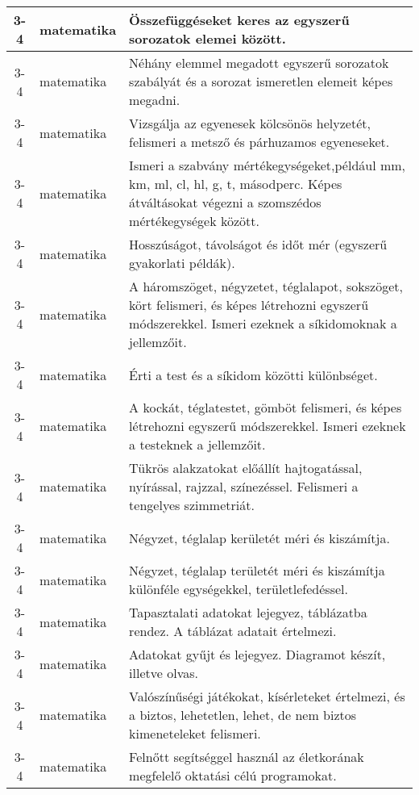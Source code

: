 \begin{small}
\begin{longtable}{c | p{2cm} |  p{11cm} }
              3-4 & matematika & Összefüggéseket keres az egyszerű sorozatok elemei között. \\ \hline
              3-4 & matematika & Néhány elemmel megadott egyszerű sorozatok szabályát és a sorozat ismeretlen elemeit képes megadni. \\ \hline
              3-4 & matematika & Vizsgálja az egyenesek kölcsönös helyzetét, felismeri a metsző és párhuzamos egyeneseket. \\ \hline
              3-4 & matematika & Ismeri a szabvány mértékegységeket,például mm, km, ml, cl, hl, g, t, másodperc. Képes átváltásokat végezni a szomszédos mértékegységek között. \\ \hline
              3-4 & matematika & Hosszúságot, távolságot és időt mér (egyszerű gyakorlati példák). \\ \hline
              3-4 & matematika & A háromszöget, négyzetet, téglalapot, sokszöget, kört felismeri, és képes létrehozni egyszerű módszerekkel. Ismeri ezeknek a síkidomoknak a jellemzőit. \\ \hline
              3-4 & matematika & Érti a test és a síkidom közötti különbséget. \\ \hline
              3-4 & matematika & A kockát, téglatestet, gömböt felismeri, és képes létrehozni egyszerű módszerekkel. Ismeri ezeknek a testeknek a jellemzőit. \\ \hline
              3-4 & matematika & Tükrös alakzatokat  előállít hajtogatással, nyírással, rajzzal, színezéssel. Felismeri a tengelyes szimmetriát. \\ \hline
              3-4 & matematika & Négyzet, téglalap kerületét méri és kiszámítja. \\ \hline
              3-4 & matematika & Négyzet, téglalap területét méri és kiszámítja különféle egységekkel, területlefedéssel. \\ \hline
              3-4 & matematika & Tapasztalati adatokat lejegyez, táblázatba rendez. A táblázat adatait értelmezi. \\ \hline
              3-4 & matematika & Adatokat gyűjt és lejegyez. Diagramot készít, illetve olvas. \\ \hline
              3-4 & matematika & Valószínűségi játékokat, kísérleteket értelmezi, és a biztos, lehetetlen, lehet, de nem biztos kimeneteleket felismeri. \\ \hline
              3-4 & matematika & Felnőtt segítséggel használ az életkorának megfelelő oktatási célú programokat. \\ \hline

\end{longtable}
\end{small}
